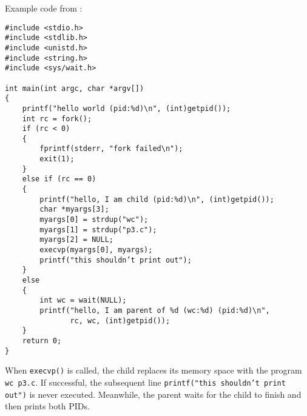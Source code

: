 Example code from \cite{ArpaciDusseau23-Book}:
\begin{center}
    \begin{minipage}{0.9\linewidth}
        \begin{verbatim}
#include <stdio.h>
#include <stdlib.h>
#include <unistd.h>
#include <string.h>
#include <sys/wait.h>

int main(int argc, char *argv[])
{
    printf("hello world (pid:%d)\n", (int)getpid());
    int rc = fork();
    if (rc < 0)
    {
        fprintf(stderr, "fork failed\n");
        exit(1);
    }
    else if (rc == 0)
    {
        printf("hello, I am child (pid:%d)\n", (int)getpid());
        char *myargs[3];
        myargs[0] = strdup("wc");
        myargs[1] = strdup("p3.c");
        myargs[2] = NULL;
        execvp(myargs[0], myargs);
        printf("this shouldn’t print out");
    }
    else
    {
        int wc = wait(NULL);
        printf("hello, I am parent of %d (wc:%d) (pid:%d)\n",
               rc, wc, (int)getpid());
    }
    return 0;
}
\end{verbatim}
    \end{minipage}
\end{center}

When \texttt{execvp()} is called, the child replaces its memory space
with the program \texttt{wc p3.c}.
If successful, the subsequent line
\texttt{printf("this shouldn't print out")} is never executed.
Meanwhile, the parent waits for the child to finish and then prints both PIDs.